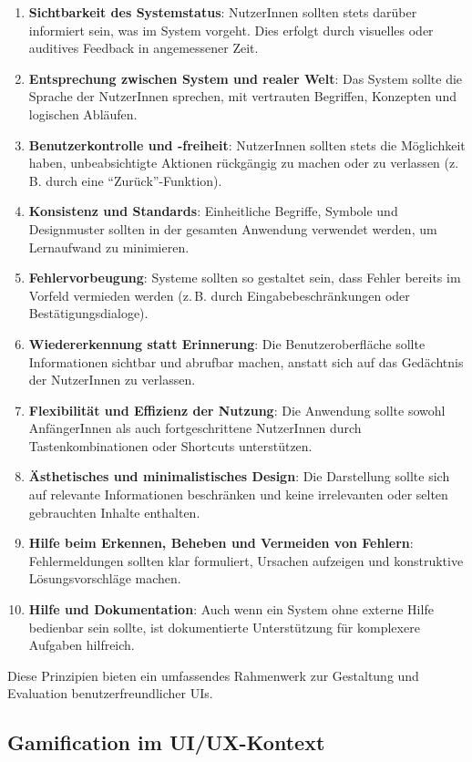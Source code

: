 \begin{enumerate}
	\item \textbf{Sichtbarkeit des Systemstatus}: NutzerInnen sollten stets darüber informiert sein, was im System vorgeht. Dies erfolgt durch visuelles oder auditives Feedback in angemessener Zeit.
	\item \textbf{Entsprechung zwischen System und realer Welt}: Das System sollte die Sprache der NutzerInnen sprechen, mit vertrauten Begriffen, Konzepten und logischen Abläufen.
	\item \textbf{Benutzerkontrolle und -freiheit}: NutzerInnen sollten stets die Möglichkeit haben, unbeabsichtigte Aktionen rückgängig zu machen oder zu verlassen (z.\,B. durch eine \enquote{Zurück}-Funktion).
	\item \textbf{Konsistenz und Standards}: Einheitliche Begriffe, Symbole und Designmuster sollten in der gesamten Anwendung verwendet werden, um Lernaufwand zu minimieren.
	\item \textbf{Fehlervorbeugung}: Systeme sollten so gestaltet sein, dass Fehler bereits im Vorfeld vermieden werden (z.\,B. durch Eingabebeschränkungen oder Bestätigungsdialoge).
	\item \textbf{Wiedererkennung statt Erinnerung}: Die Benutzeroberfläche sollte Informationen sichtbar und abrufbar machen, anstatt sich auf das Gedächtnis der NutzerInnen zu verlassen.
	\item \textbf{Flexibilität und Effizienz der Nutzung}: Die Anwendung sollte sowohl AnfängerInnen als auch fortgeschrittene NutzerInnen durch Tastenkombinationen oder Shortcuts unterstützen.
	\item \textbf{Ästhetisches und minimalistisches Design}: Die Darstellung sollte sich auf relevante Informationen beschränken und keine irrelevanten oder selten gebrauchten Inhalte enthalten.
	\item \textbf{Hilfe beim Erkennen, Beheben und Vermeiden von Fehlern}: Fehlermeldungen sollten klar formuliert, Ursachen aufzeigen und konstruktive Lösungsvorschläge machen.
	\item \textbf{Hilfe und Dokumentation}: Auch wenn ein System ohne externe Hilfe bedienbar sein sollte, ist dokumentierte Unterstützung für komplexere Aufgaben hilfreich.
\end{enumerate}

Diese Prinzipien bieten ein umfassendes Rahmenwerk zur Gestaltung und Evaluation benutzerfreundlicher \acp{UI}.

\subsection{Gamification im UI/UX-Kontext}

